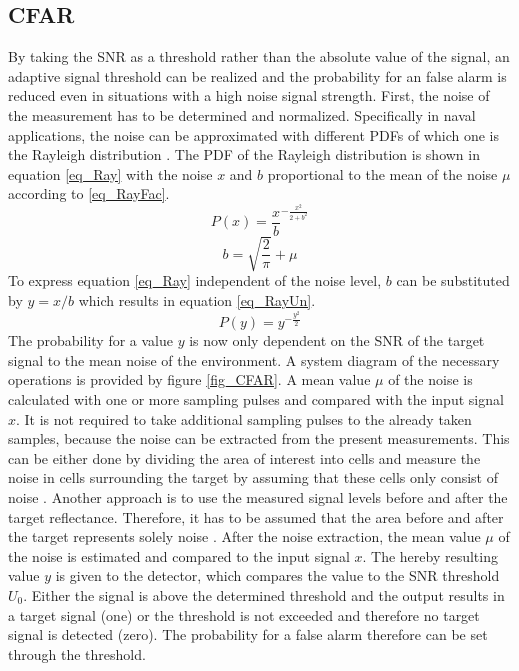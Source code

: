    \subsection{\ac{CFAR}} \label{CFARthr}
    By taking the \ac{SNR} as a threshold rather than the absolute value of the signal, an adaptive signal threshold can be realized and the probability for an false alarm is reduced even in situations with a high noise signal strength. First, the noise of the measurement has to be determined and normalized. Specifically in naval applications, the noise can be approximated with different \acp{PDF} of which one is the Rayleigh distribution \cite{SeaClutter}. The \ac{PDF} of the Rayleigh distribution is shown in equation \ref{eq_Ray} with the noise $x$ and $b$ proportional to the mean of the noise $\mu$ according to \ref{eq_RayFac}.  
   \begin{equation}
   \label{eq_Ray}
   P(x)=\frac{x}{b}^{-\frac{x^2}{2+b^2}}
   \end{equation}
   \begin{equation}
   b=\sqrt{\frac{2}{\pi}}+\mu
   \label{eq_RayFac}
   \end{equation}
   To express equation \ref{eq_Ray} independent of the noise level, $b$ can be substituted by $y=x/b$ which results in equation \ref{eq_RayUn}. \begin{equation}
   \label{eq_RayUn}
   P(y)=y^{-\frac{y^2}{2}}
   \end{equation} 
   The probability for a value $y$ is now only dependent on the \ac{SNR} of the target signal to the mean noise of the environment. A system diagram of the necessary operations is provided by figure \ref{fig_CFAR}. A mean value $\mu$ of the noise is calculated with one or more sampling pulses and compared with the input signal $x$. It is not required to take additional sampling pulses to the already taken samples, because the noise can be extracted from the present measurements. This can be either done by dividing the area of interest into cells and measure the noise in cells surrounding the target by assuming that these cells only consist of noise \cite{SigProcRADAR}. Another approach is to use the measured signal levels before and after the target reflectance. Therefore, it has to be assumed that the area before and after the target represents solely noise \cite{EnvPerc}. After the noise extraction, the mean value $\mu$ of the noise is estimated and compared to the input signal $x$. The hereby resulting value $y$ is given to the detector, which compares the value to the  \ac{SNR} threshold $U_0$. Either the signal is above the determined threshold and the output results in a target signal (one) or the threshold is not exceeded and therefore no target signal is detected (zero). The probability for a false alarm therefore can be set through the threshold.
